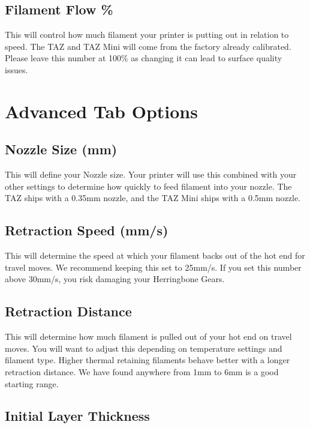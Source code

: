 \subsection{Filament Flow \%}

This will control how much filament your printer is putting out in relation to speed. The TAZ and TAZ Mini will come from the factory already calibrated. Please leave this number at 100\% as changing it can lead to surface quality issues.

\section{Advanced Tab Options}

\subsection{Nozzle Size (mm)}

This will define your Nozzle size. Your printer will use this combined with your other settings to determine how quickly to feed filament into your nozzle. The TAZ ships with a 0.35mm nozzle, and the TAZ Mini ships with a 0.5mm nozzle.

\subsection{Retraction Speed (mm/s)}

This will determine the speed at which your filament backs out of the hot end for travel moves. We recommend keeping this set to 25mm/s. If you set this number above 30mm/s, you risk damaging your Herringbone Gears.

\subsection{Retraction Distance}

This will determine how much filament is pulled out of your hot end on travel moves. You will want to adjust this depending on temperature settings and filament type. Higher thermal retaining filaments behave better with a longer retraction distance. We have found anywhere from 1mm to 6mm is a good starting range.

\subsection{Initial Layer Thickness}

